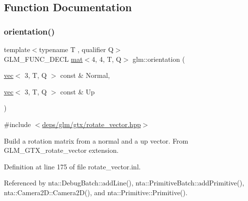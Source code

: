\subsection{Function Documentation}
\mbox{\label{group__gtx__rotate__vector_ga1a32fceb71962e6160e8af295c91930a}} 
\subsubsection{\texorpdfstring{orientation()}{orientation()}}
{\footnotesize\ttfamily template$<$typename T , qualifier Q$>$ \\
G\+L\+M\+\_\+\+F\+U\+N\+C\+\_\+\+D\+E\+CL \hyperlink{structglm_1_1mat}{mat}$<$4, 4, T, Q$>$ glm\+::orientation (\begin{DoxyParamCaption}\item[{\hyperlink{structglm_1_1vec}{vec}$<$ 3, T, Q $>$ const \&}]{Normal,  }\item[{\hyperlink{structglm_1_1vec}{vec}$<$ 3, T, Q $>$ const \&}]{Up }\end{DoxyParamCaption})}



{\ttfamily \#include $<$\hyperlink{rotate__vector_8hpp}{deps/glm/gtx/rotate\+\_\+vector.\+hpp}$>$}

Build a rotation matrix from a normal and a up vector. From G\+L\+M\+\_\+\+G\+T\+X\+\_\+rotate\+\_\+vector extension. 

Definition at line 175 of file rotate\+\_\+vector.\+inl.



Referenced by nta\+::\+Debug\+Batch\+::add\+Line(), nta\+::\+Primitive\+Batch\+::add\+Primitive(), nta\+::\+Camera2\+D\+::\+Camera2\+D(), and nta\+::\+Primitive\+::\+Primitive().

